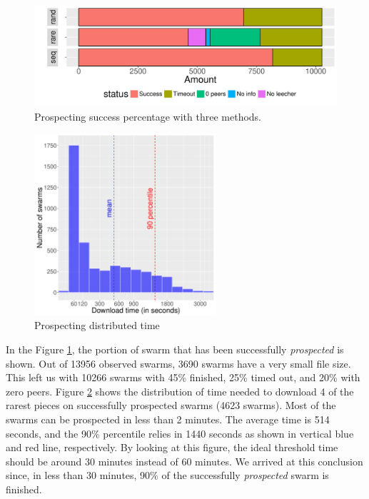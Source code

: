 \begin{figure}[h]
	\centering
	\includegraphics[width=\textwidth]{pics/results/dpredown_merge.pdf}
	\caption{Prospecting success percentage with three methods.}
	\label{fig:predownprecent}
\end{figure}

\begin{figure}[h]
	\centering
	\includegraphics[width=0.6\textwidth]{pics/results/hpredown.pdf}
	\caption{Prospecting distributed time}
	\label{fig:predownhist}
\end{figure}

In the Figure \ref{fig:predownprecent}, the portion of swarm that has been successfully \textit{prospected} is shown. Out of 13956 observed swarms, 3690 swarms have a very small file size. This left us with 10266 swarms with 45\% finished, 25\% timed out, and 20\% with zero peers. Figure \ref{fig:predownhist} shows the distribution of time needed to download 4 of the rarest pieces on successfully prospected swarms (4623 swarms). Most of the swarms can be prospected in less than 2 minutes. The average time is 514 seconds, and the 90\% percentile relies in 1440 seconds as shown in vertical blue and red line, respectively. By looking at this figure, the ideal threshold time should be around 30 minutes instead of 60 minutes. We arrived at this conclusion since, in less than 30 minutes, 90\% of the successfully \textit{prospected} swarm is finished.

